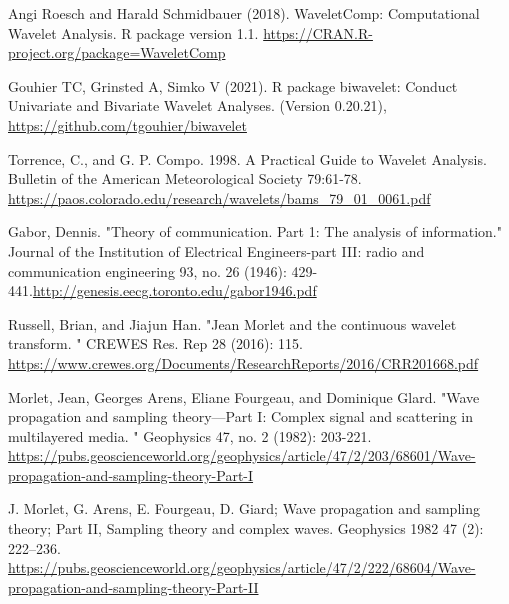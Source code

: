 \documentclass[a4paper]{book}
\begin{document}
%
\begin{References}
Angi Roesch and Harald Schmidbauer (2018). WaveletComp: Computational
Wavelet Analysis. R package version 1.1.
\url{https://CRAN.R-project.org/package=WaveletComp}

Gouhier TC, Grinsted A, Simko V (2021). R package biwavelet: Conduct Univariate and Bivariate Wavelet Analyses. (Version 0.20.21),
\url{https://github.com/tgouhier/biwavelet}

Torrence, C., and G. P. Compo. 1998. A Practical Guide to Wavelet Analysis.
Bulletin of the American Meteorological Society 79:61-78.
\url{https://paos.colorado.edu/research/wavelets/bams_79_01_0061.pdf}

Gabor, Dennis. "Theory of communication. Part 1: The analysis of information."
Journal of the Institution of Electrical Engineers-part III: radio and
communication engineering 93, no. 26 (1946): 429-441.\url{http://genesis.eecg.toronto.edu/gabor1946.pdf}

Russell, Brian, and Jiajun Han. "Jean Morlet and the continuous wavelet transform.
" CREWES Res. Rep 28 (2016): 115. \url{https://www.crewes.org/Documents/ResearchReports/2016/CRR201668.pdf}


Morlet, Jean, Georges Arens, Eliane Fourgeau, and Dominique Glard.
"Wave propagation and sampling theory—Part I: Complex signal and scattering in multilayered media.
" Geophysics 47, no. 2 (1982): 203-221.
\url{https://pubs.geoscienceworld.org/geophysics/article/47/2/203/68601/Wave-propagation-and-sampling-theory-Part-I}

J. Morlet, G. Arens, E. Fourgeau, D. Giard;
Wave propagation and sampling theory; Part II, Sampling theory and complex waves.
Geophysics 1982 47 (2): 222–236. \url{https://pubs.geoscienceworld.org/geophysics/article/47/2/222/68604/Wave-propagation-and-sampling-theory-Part-II}
\end{References}
%
\end{document}
